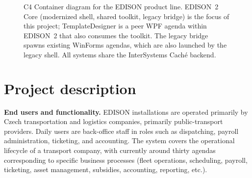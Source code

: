 \documentclass{article}
\begin{document}
\begin{figure}[h]
\caption{C4 Container diagram for the EDISON product line. EDISON~2 Core (modernized shell, shared toolkit, legacy bridge) is the focus of this project; TemplateDesigner is a peer WPF agenda within EDISON~2 that also consumes the toolkit. The legacy bridge spawns existing WinForms agendas, which are also launched by the legacy shell. All systems share the InterSystems Cach\'e backend.}
\label{fig:c4-container}
\end{figure}

\section{Project description}

\textbf{End users and functionality.} EDISON installations are operated primarily by Czech transportation and logistics companies, primarily public-transport providers. Daily users are back-office staff in roles such as dispatching, payroll administration, ticketing, and accounting. The system covers the operational lifecycle of a transport company, with currently around thirty agendas corresponding to specific business processes (fleet operations, scheduling, payroll, ticketing, asset management, subsidies, accounting, reporting, etc.).
\end{document}
